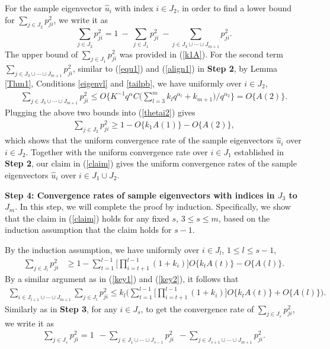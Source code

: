\documentclass{statsoc}
\begin{document}
For the sample eigenvector $\widehat{u}_i$ with index $i \in J_2$, in order to find a lower bound for $\sum_{j \in J_2} p_{ji}^2$, we write it as
\begin{equation}\label{thetai2}
\sum_{j \in J_2} p_{ji}^2 = 1 \ - \ \sum_{j \in J_1} p_{ji}^2 \ - \sum_{j \in J_3 \cup \cdots \cup J_{m + 1}} p_{ji}^2.
\end{equation}
The upper bound of $\sum_{j \in J_1} p_{ji}^2$ was provided in (\ref{k1A}). For the second term $\sum_{j \in J_{3} \cup \cdots \cup J_{m + 1}} p_{ji}^2$, similar to (\ref{equ1}) and (\ref{align1}) in \textbf{Step 2}, by Lemma \ref{Thm1}, Conditions \ref{eigenvl} and \ref{tailpb}, we have uniformly over $i \in J_2$,
\begin{align*}
\sum_{j \in J_{3} \cup \cdots \cup J_{m + 1}} p_{ji}^2 \leq O\{K^{-1} q^{\alpha} C \big(\sum_{l = 3}^m k_l q^{\alpha_l} + k_{m + 1} \big)/q^{\alpha_2}\} = O\{A(2)\}.
\end{align*}
Plugging the above two bounds into (\ref{thetai2}) gives
\begin{align*}
\sum_{j \in J_2} p_{ji}^2 \geq 1 - O\{k_1 A(1)\} - O\{A(2)\},
\end{align*}
which shows that the uniform convergence rate of the sample eigenvectors $\widehat{u}_i$ over $i \in J_2$. Together with the uniform convergence rate over $i \in J_1$ established in \textbf{Step 2}, our claim in (\ref{claim}) gives the uniform convergence rates of the sample eigenvectors $\widehat{u}_i$ over $i \in J_1 \cup J_2$.

\medskip

\noindent \textbf{Step 4: Convergence rates of sample eigenvectors with indices in $J_3$ to $J_m$}. In this step, we will complete the proof by induction. Specifically, we show that the claim in (\ref{claim}) holds for any fixed $s$, $3 \leq s \leq m$, based on the induction assumption that the claim holds for $s - 1$.

By the induction assumption, we have uniformly over $i \in J_l$, $1 \leq l \leq s - 1$,
\begin{align*}
\sum_{j \in J_{l}} p_{ji}^2 & \geq 1 - \sum_{t = 1}^{l - 1} \big[\prod_{i = t + 1}^{l - 1} (1 + k_i)\big] O\{k_t A(t)\} - O\{A(l)\}.
\end{align*}
By a similar argument as in (\ref{key1}) and (\ref{key2}), it follows that
\begin{align}\label{Js}
\sum_{i \in J_{l + 1} \cup \cdots \cup J_{m + 1}} \sum_{j \in J_{l}} p_{ji}^2 \leq k_l \big(\sum_{t = 1}^{l - 1} \big[\prod_{i = t + 1}^{l - 1} (1 + k_i)\big] O\{k_t A(t)\} + O\{A(l)\}\big).
\end{align}
Similarly as in \textbf{Step 3}, for any $i \in J_{s}$, to get the convergence rate of $\sum_{j \in J_{s}} p_{ji}^2$, we write it as
\begin{align*}
\sum_{j \in J_{s}} p_{ji}^2 = 1 \ \ - \sum_{j \in J_1 \cup \cdots \cup J_{s - 1}} p_{ji}^2 \ \ - \sum_{j \in J_{s + 1} \cup \cdots \cup J_{m + 1}} p_{ji}^2.
\end{align*}
\end{document}
